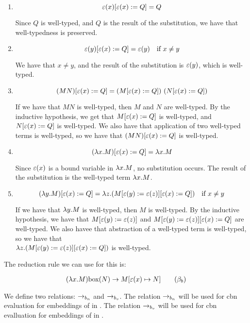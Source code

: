 \begin{enumerate}
  \item%
  \[
  \varepsilon(x)[\varepsilon(x) := Q] = Q
  \]
  
  Since $Q$ is well-typed, and $Q$ is the result of the substitution, we have that well-typedness is preserved.
  \item%
  \[
  \varepsilon(y)[\varepsilon(x) := Q] = \varepsilon(y) \quad \text{if} \ x \neq y
  \]

  We have that $x \neq y$, and the result of the substitution is $\varepsilon(y)$, which is well-typed.
  
  \item%
  \[
  (M N)[\varepsilon(x) := Q] = (M[\varepsilon(x) := Q]) \ (N[\varepsilon(x) := Q])
  \]

  If we have that $M N$ is well-typed, then $M$ and $N$ are well-typed.
  By the inductive hypothesis, we get that $M[\varepsilon(x) := Q]$ is well-typed, and $N[\varepsilon(x) := Q]$ is well-typed.
  We also have that application of two well-typed terms is well-typed, so we have that $(M N)[\varepsilon(x) := Q]$ is well-typed.

  \item%
  \[
  (\lambda {x}.{M})[\varepsilon(x) := Q] = \lambda {x}.{M}
  \]

  Since $\varepsilon(x)$ is a bound variable in $\lambda {x}.{M}$, no substitution occurs. The result of the substitution is the well-typed term $\lambda {x}.{M}$.

  \item%
  \[
  (\lambda {y}.{M})[\varepsilon(x) := Q] = \lambda {z}.{(M[\varepsilon(y) := \varepsilon(z)][\varepsilon(x) := Q])} \quad \text{if} \ x \neq y
  \]

  If we have that $\lambda {y}.{M}$ is well-typed, then $M$ is well-typed.
  By the inductive hypothesis, we have that $M[\varepsilon(y) := \varepsilon(z)]$ and $M[\varepsilon(y) := \varepsilon(z)][\varepsilon(x) := Q]$ are well-typed.
  We also havee that abstraction of a well-typed term is well-typed, so we have that \\
  $\lambda {z}.{(M[\varepsilon(y) := \varepsilon(z)][\varepsilon(x) := Q])}$ is well-typed.
\end{enumerate}

The reduction rule we can use for this \lc is:

\begin{align*}
  (\lambda {x}.{M})\text{box}({N}) \to M [{\varepsilon(x)}\mapsto{N}] \quad \quad (\beta_b)
\end{align*}

We define two relations: $\to_{b_n}$ and $\to_{b_v}$. The relation $\to_{b_n}$ will be used for cbn evaluation for embeddings of \lan in \lab.
The relation $\to_{b_v}$ will be used for cbn evalluation for embeddings of \lav in \lab. 

